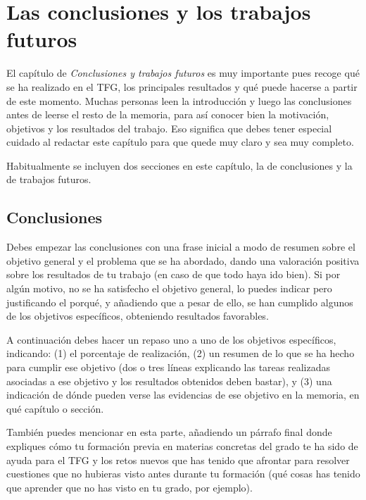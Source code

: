 \chapter{Las conclusiones y los trabajos futuros}
\label{cap:Conclusiones}

El capítulo de \textit{Conclusiones y trabajos futuros} es muy importante pues recoge qué se ha realizado en el TFG, los principales resultados y qué puede hacerse a partir de este momento. Muchas personas leen la introducción y luego las conclusiones antes de leerse el resto de la memoria, para así conocer bien la motivación, objetivos y los resultados del trabajo. Eso significa que debes tener especial cuidado al redactar este capítulo para que quede muy claro y sea muy completo.

Habitualmente se incluyen dos secciones en este capítulo, la de conclusiones y la de trabajos futuros.
 
 \section{Conclusiones}

Debes empezar las conclusiones con una frase inicial a modo de resumen sobre el objetivo general y el problema que se ha abordado, dando una valoración positiva sobre los resultados de tu trabajo (en caso de que todo haya ido bien). Si por algún motivo, no se ha satisfecho el objetivo general, lo puedes indicar pero justificando el porqué, y añadiendo que a pesar de ello, se han cumplido algunos de los objetivos específicos, obteniendo resultados favorables. 

A continuación debes hacer un repaso uno a uno de los objetivos específicos, indicando: (1) el porcentaje de realización, (2) un resumen de lo que se ha hecho para cumplir ese objetivo (dos o tres líneas explicando las tareas realizadas asociadas a ese objetivo y los resultados obtenidos deben bastar), y (3) una indicación de dónde pueden verse las evidencias de ese objetivo en la memoria, en qué capítulo o sección.

También puedes mencionar en esta parte, añadiendo un párrafo final donde expliques cómo tu formación previa en materias concretas del grado te ha sido de ayuda para el TFG y los retos nuevos que has tenido que afrontar para resolver cuestiones que no hubieras visto antes durante tu formación (qué cosas has tenido que aprender que no has visto en tu grado, por ejemplo).

